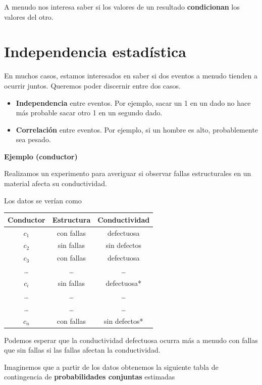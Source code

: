 \documentclass[
]{book}
\begin{document}
A menudo nos interesa saber si los valores de un resultado \textbf{condicionan} los valores del otro.

\hypertarget{independencia-estaduxedstica}{%
\section{Independencia estadística}\label{independencia-estaduxedstica}}

En muchos casos, estamos interesados en saber si dos eventos a menudo tienden a ocurrir juntos. Queremos poder discernir entre dos casos.

\begin{itemize}
\item
  \textbf{Independencia} entre eventos. Por ejemplo, sacar un 1 en un dado no hace más probable sacar otro 1 en un segundo dado.
\item
  \textbf{Correlación} entre eventos. Por ejemplo, si un hombre es alto, probablemente sea pesado.
\end{itemize}

\textbf{Ejemplo (conductor)}

Realizamos un experimento para averiguar si observar fallas estructurales en un material afecta su conductividad.

Los datos se verían como

\begin{longtable}[]{@{}ccc@{}}
\toprule\noalign{}
Conductor & Estructura & Conductividad \\
\midrule\noalign{}
\endhead
\bottomrule\noalign{}
\endlastfoot
\(c_1\) & con fallas & defectuosa \\
\(c_2\) & sin fallas & sin defectos \\
\(c_3\) & con fallas & defectuosa \\
\ldots{} & \ldots{} & \ldots{} \\
\(c_i\) & sin fallas & defectuosa* \\
\ldots{} & \ldots{} & \ldots{} \\
\ldots{} & \ldots{} & \ldots{} \\
\(c_n\) & con fallas & sin defectos* \\
\end{longtable}

Podemos esperar que la conductividad defectuosa ocurra más a menudo con fallas que sin fallas si las fallas afectan la conductividad.

Imaginemos que a partir de los datos obtenemos la siguiente tabla de contingencia de \textbf{probabilidades conjuntas} estimadas
\end{document}
